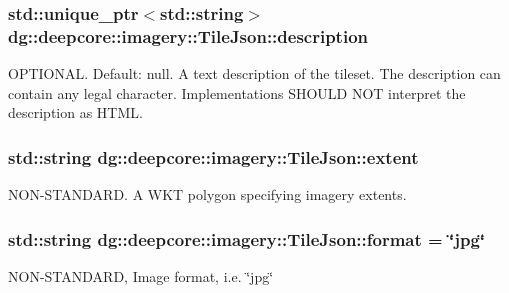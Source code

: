 \subsubsection[{\texorpdfstring{description}{description}}]{\setlength{\rightskip}{0pt plus 5cm}std\+::unique\+\_\+ptr$<$std\+::string$>$ dg\+::deepcore\+::imagery\+::\+Tile\+Json\+::description}\hypertarget{structdg_1_1deepcore_1_1imagery_1_1_tile_json_ac2dd8a58ac978ddb8c01fbd5c7fa4820}{}\label{structdg_1_1deepcore_1_1imagery_1_1_tile_json_ac2dd8a58ac978ddb8c01fbd5c7fa4820}
O\+P\+T\+I\+O\+N\+AL. Default\+: null. A text description of the tileset. The description can contain any legal character. Implementations S\+H\+O\+U\+LD N\+OT interpret the description as H\+T\+ML. 
\subsubsection[{\texorpdfstring{extent}{extent}}]{\setlength{\rightskip}{0pt plus 5cm}std\+::string dg\+::deepcore\+::imagery\+::\+Tile\+Json\+::extent}\hypertarget{structdg_1_1deepcore_1_1imagery_1_1_tile_json_a3dbce2d3f97e8abdb60db7cf5b1ede54}{}\label{structdg_1_1deepcore_1_1imagery_1_1_tile_json_a3dbce2d3f97e8abdb60db7cf5b1ede54}
N\+O\+N-\/\+S\+T\+A\+N\+D\+A\+RD. A W\+KT polygon specifying imagery extents.
\subsubsection[{\texorpdfstring{format}{format}}]{\setlength{\rightskip}{0pt plus 5cm}std\+::string dg\+::deepcore\+::imagery\+::\+Tile\+Json\+::format = \char`\"{}jpg\char`\"{}}\hypertarget{structdg_1_1deepcore_1_1imagery_1_1_tile_json_a0ac858ae62a9b9243e8bd8c31a86af7b}{}\label{structdg_1_1deepcore_1_1imagery_1_1_tile_json_a0ac858ae62a9b9243e8bd8c31a86af7b}
N\+O\+N-\/\+S\+T\+A\+N\+D\+A\+RD, Image format, i.\+e. \char`\"{}jpg\char`\"{} 
